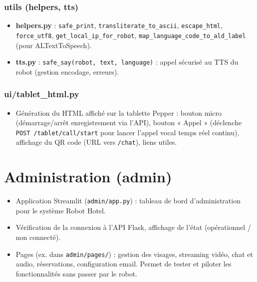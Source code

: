 \documentclass[12pt,a4paper]{article}
\begin{document}
\subsubsection{utils (helpers, tts)}

\begin{itemize}[noitemsep]
  \item \textbf{helpers.py} : \texttt{safe\_print}, \texttt{transliterate\_to\_ascii}, \texttt{escape\_html}, \texttt{force\_utf8}, \texttt{get\_local\_ip\_for\_robot}, \texttt{map\_language\_code\_to\_ald\_label} (pour ALTextToSpeech).
  \item \textbf{tts.py} : \texttt{safe\_say(robot, text, language)} : appel sécurisé au TTS du robot (gestion encodage, erreurs).
\end{itemize}

\subsubsection{ui/tablet\_html.py}

\begin{itemize}[noitemsep]
  \item Génération du HTML affiché sur la tablette Pepper : bouton micro (démarrage/arrêt enregistrement via l'API), bouton « Appel » (déclenche \texttt{POST /tablet/call/start} pour lancer l'appel vocal temps réel continu), affichage du QR code (URL vers \texttt{/chat}), liens utiles.
\end{itemize}

\section{Administration (admin)}

\begin{itemize}[noitemsep]
  \item Application Streamlit (\texttt{admin/app.py}) : tableau de bord d'administration pour le système Robot Hotel.
  \item Vérification de la connexion à l'API Flask, affichage de l'état (opérationnel / non connecté).
  \item Pages (ex. dans \texttt{admin/pages/}) : gestion des visages, streaming vidéo, chat et audio, réservations, configuration email. Permet de tester et piloter les fonctionnalités sans passer par le robot.
\end{itemize}
\end{document}
